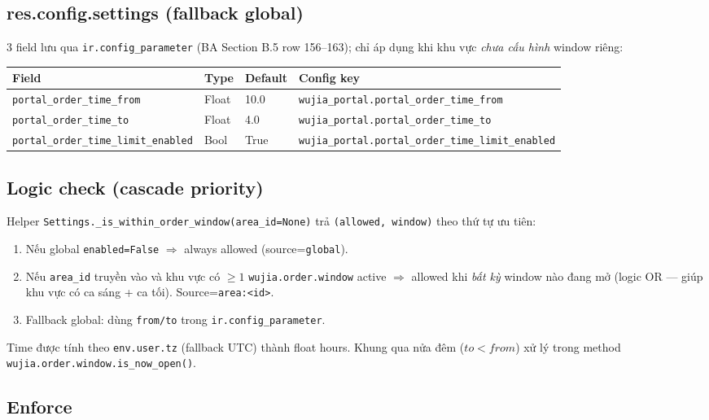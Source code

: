 \subsection{res.config.settings (fallback global)}

3 field lưu qua \texttt{ir.config\_parameter} (BA Section B.5 row 156--163);
chỉ áp dụng khi khu vực \emph{chưa cấu hình} window riêng:

\begin{tabular}{llll}
\toprule
\textbf{Field} & \textbf{Type} & \textbf{Default} & \textbf{Config key} \\
\midrule
\texttt{portal\_order\_time\_from} & Float & 10.0 & \texttt{wujia\_portal.portal\_order\_time\_from} \\
\texttt{portal\_order\_time\_to} & Float & 4.0 & \texttt{wujia\_portal.portal\_order\_time\_to} \\
\texttt{portal\_order\_time\_limit\_enabled} & Bool & True & \texttt{wujia\_portal.portal\_order\_time\_limit\_enabled} \\
\bottomrule
\end{tabular}

\subsection{Logic check (cascade priority)}

Helper \texttt{Settings.\_is\_within\_order\_window(area\_id=None)} trả
\texttt{(allowed, window)} theo thứ tự ưu tiên:

\begin{enumerate}[leftmargin=*]
    \item Nếu global \texttt{enabled=False} \(\Rightarrow\) always allowed
          (source=\texttt{global}).
    \item Nếu \texttt{area\_id} truyền vào và khu vực có \(\ge 1\)
          \texttt{wujia.order.window} active \(\Rightarrow\) allowed khi
          \emph{bất kỳ} window nào đang mở (logic OR --- giúp khu vực có
          ca sáng + ca tối). Source=\texttt{area:<id>}.
    \item Fallback global: dùng \texttt{from/to} trong
          \texttt{ir.config\_parameter}.
\end{enumerate}

Time được tính theo \texttt{env.user.tz} (fallback UTC) thành float hours.
Khung qua nửa đêm (\(to < from\)) xử lý trong method
\texttt{wujia.order.window.is\_now\_open()}.

\subsection{Enforce}

